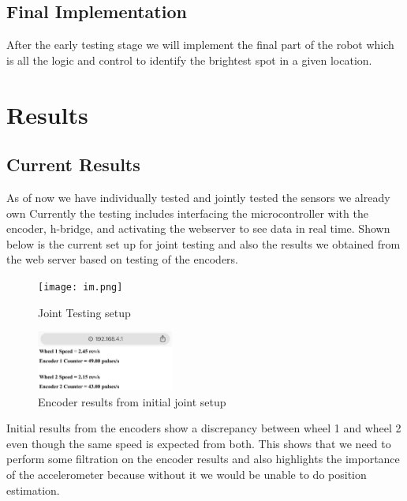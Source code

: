 \documentclass[conference]{IEEEtran}
\begin{document}
    \subsection{Final Implementation}

    After the early testing stage we will implement the final part of the robot which is all the logic
    and control to identify the brightest spot in a given location.
    
    \section{Results}

    \subsection{Current Results}

    As of now we have individually tested and jointly tested the sensors we already own
    Currently the testing includes interfacing the microcontroller with the encoder, h-bridge,
    and activating the webserver to see data in real time. Shown below is the current set up
    for joint testing and also the results we obtained from the web server based on testing
    of the encoders.\\

    \begin{figure}[H]
        \centering
        \captionsetup{justification=centering}
        \centering
        \texttt{[image: im.png]}
        \caption{Joint Testing setup}
    \end{figure}

    \begin{figure}[H]
        \centering
        \captionsetup{justification=centering}
        \centering
        \includegraphics[width=0.4\textwidth]{t2.png}
        \caption{Encoder results from initial joint setup}
    \end{figure}

    Initial results from the encoders show a discrepancy between wheel 1 and wheel 2 even though
    the same speed is expected from both. This shows that we need to perform some filtration on
    the encoder results and also highlights the importance of the accelerometer because without it
    we would be unable to do position estimation. 
\end{document}
